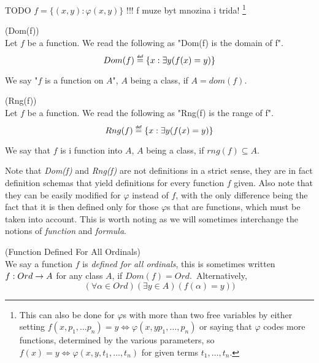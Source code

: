 TODO $f = \{(x, y) : \varphi(x, y)\}$ !!! f muze byt mnozina i trida!
\footnote{This can also be done for $\varphi$s with more than two free variables by either setting $f(x, p_1, \ldots p_n) = y \iff \varphi(x, y p_1, \ldots, p_n)$ or saying that $\varphi$ codes more functions, determined by the various parameters, so $f(x) = y \iff \varphi(x, y, t_1, \ldots, t_n)$ for given terms $t_1, \ldots, t_n$.}

\begin{definition}{(Dom(f))}\label{def:dom}\\
Let $f$ be a function. We read the following as "Dom(f) is the domain of f".
\begin{equation}
Dom(f) \defeq \{x : \exists y (f(x) = y)\}
\end{equation}
\end{definition}
We say "$f$ is a function on $A$", $A$ being a class, if $A = dom(f)$.

\begin{definition}{(Rng(f))}\label{def:rng}\\
Let $f$ be a function. We read the following as "Rng(f) is the range of f".
\begin{equation}
Rng(f) \defeq \{x : \exists y (f(x) = y)\}
\end{equation}
\end{definition}
We say that $f$ is i function into $A$, $A$ being a class, if $rng(f) \subseteq A$.

Note that \emph{Dom(f)} and \emph{Rng(f)} are not definitions in a strict sense, they are in fact definition schemas that yield definitions for every function $f$ given. Also note that they can be easily modified for $\varphi$ instead of $f$, with the only difference being the fact that it is then defined only for those $\varphi$s that are functions, which must be taken into account. This is worth noting as we will sometimes interchange the notions of \emph{function} and \emph{formula}.

\begin{definition}{(Function Defined For All Ordinals)}\label{def:function_dfao}\\
We say a function $f$ is \emph{defined for all ordinals}, this is sometimes written $f: Ord \rightarrow A$ for any class $A$, if $Dom(f) = Ord$.\
Alternatively,
\begin{equation}
(\forall \alpha \in Ord)(\exists y \in A)(f(\alpha) = y))
\end{equation}
\end{definition}

